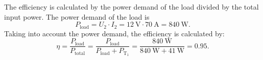 

\begin{solutionblock}
    The efficiency is calculated by the power demand of the load divided by the total input power.
    The power demand of the load is
    \begin{equation*}
        P_\mathrm{load}= U_\mathrm{2} \cdot I_\mathrm{2} = \SI{12}{\volt} \cdot \SI{70}{\ampere} = \SI{840}{\watt}.
        \label{eq:P_load}
    \end{equation*}
    Taking into account the power demand, the efficiency is calculated by:
    \begin{equation*}
        \eta=\frac{P_\mathrm{load}}{P_\mathrm{total}} = \frac{P_\mathrm{load}}{P_\mathrm{load} + P_\mathrm{T_1}}
            = \frac{\SI{840}{\watt}}{\SI{840}{\watt} + \SI{41}{\watt}}= 0.95.
        \label{eq:eta}
    \end{equation*}
\end{solutionblock}

